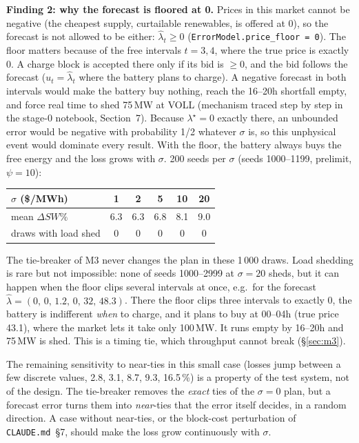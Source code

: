 \documentclass[10pt,a4paper]{article}
\newcommand{\code}[1]{\texttt{#1}}
\newcommand{\lamstar}{\lambda^{\star}}
\newcommand{\lamhat}{\hat\lambda}
\begin{document}
\textbf{Finding 2: why the forecast is floored at 0.} Prices in this market cannot be negative (the cheapest
supply, curtailable renewables, is offered at 0), so the forecast is not allowed to be either:
$\lamhat_t\ge0$ (\code{ErrorModel.price\_floor = 0}). The floor matters because of the free intervals $t=3,4$,
where the true price is exactly 0. A charge block is accepted there only if its bid is $\ge0$, and the bid
follows the forecast ($u_t=\lamhat_t$ where the battery plans to charge). A negative forecast in both
intervals would make the battery buy nothing, reach the 16--20h shortfall empty, and force real time to shed
75\,MW at VOLL (mechanism traced step by step in the stage-0 notebook, Section~7). Because $\lamstar=0$
exactly there, an unbounded error would be negative with probability 1/2 whatever $\sigma$ is, so this
unphysical event would dominate every result. With the floor, the battery always buys the free energy and
the loss grows with $\sigma$. 200 seeds per $\sigma$ (seeds 1000--1199, prelimit, $\psi=10$):
\begin{center}\small
\begin{tabular}{@{}lccccc@{}}
\toprule
$\sigma$ (\$/MWh) & 1 & 2 & 5 & 10 & 20 \\
\midrule
mean $\Delta SW\%$ & 6.3 & 6.3 & 6.8 & 8.1 & 9.0 \\
\quad draws with load shed & 0 & 0 & 0 & 0 & 0 \\
\bottomrule
\end{tabular}
\end{center}
The tie-breaker of M3 never changes the plan in these 1\,000 draws. Load shedding is rare but not
impossible: none of seeds 1000--2999 at $\sigma=20$ sheds, but it can happen when the floor clips several
intervals at once, e.g.\ for the forecast $\lamhat=(0,\,0,\,1.2,\,0,\,32,\,48.3)$. There the floor clips three intervals
to exactly 0, the battery is indifferent \emph{when} to charge, and it plans to buy at 00--04h (true price
43.1), where the market lets it take only 100\,MW. It runs empty by 16--20h and 75\,MW is shed. This is a
timing tie, which throughput cannot break (\S\ref{sec:m3}).

The remaining sensitivity to near-ties in this small case (losses jump between a few discrete values, 2.8, 3.1,
8.7, 9.3, 16.5\,\%) is a property of the test system, not of the design. The tie-breaker removes the
\emph{exact} ties of the $\sigma=0$ plan, but a forecast error turns them into \emph{near}-ties that the error
itself decides, in a random direction. A case without near-ties, or the block-cost perturbation of
\code{CLAUDE.md}~\S7, should make the loss grow continuously with $\sigma$.
\end{document}
